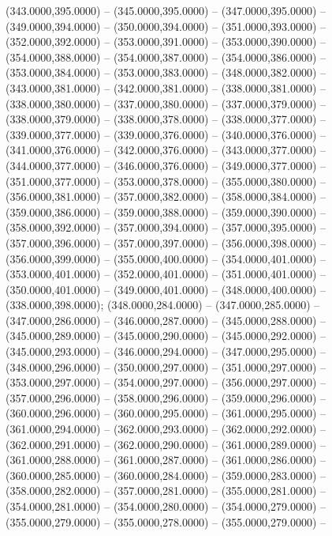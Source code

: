 \begin{scope}[shift={(-231.87,-121.87)}]
\begin{scope}[draw=black,fill=cfdae61,line join=round,line width=0.208pt]
        (343.0000,395.0000) -- (345.0000,395.0000) -- (347.0000,395.0000) --
        (349.0000,394.0000) -- (350.0000,394.0000) -- (351.0000,393.0000) --
        (352.0000,392.0000) -- (353.0000,391.0000) -- (353.0000,390.0000) --
        (354.0000,388.0000) -- (354.0000,387.0000) -- (354.0000,386.0000) --
        (353.0000,384.0000) -- (353.0000,383.0000) -- (348.0000,382.0000) --
        (343.0000,381.0000) -- (342.0000,381.0000) -- (338.0000,381.0000) --
        (338.0000,380.0000) -- (337.0000,380.0000) -- (337.0000,379.0000) --
        (338.0000,379.0000) -- (338.0000,378.0000) -- (338.0000,377.0000) --
        (339.0000,377.0000) -- (339.0000,376.0000) -- (340.0000,376.0000) --
        (341.0000,376.0000) -- (342.0000,376.0000) -- (343.0000,377.0000) --
        (344.0000,377.0000) -- (346.0000,376.0000) -- (349.0000,377.0000) --
        (351.0000,377.0000) -- (353.0000,378.0000) -- (355.0000,380.0000) --
        (356.0000,381.0000) -- (357.0000,382.0000) -- (358.0000,384.0000) --
        (359.0000,386.0000) -- (359.0000,388.0000) -- (359.0000,390.0000) --
        (358.0000,392.0000) -- (357.0000,394.0000) -- (357.0000,395.0000) --
        (357.0000,396.0000) -- (357.0000,397.0000) -- (356.0000,398.0000) --
        (356.0000,399.0000) -- (355.0000,400.0000) -- (354.0000,401.0000) --
        (353.0000,401.0000) -- (352.0000,401.0000) -- (351.0000,401.0000) --
        (350.0000,401.0000) -- (349.0000,401.0000) -- (348.0000,400.0000) --
        (338.0000,398.0000);
       (348.0000,284.0000) -- (347.0000,285.0000) --
        (347.0000,286.0000) -- (346.0000,287.0000) -- (345.0000,288.0000) --
        (345.0000,289.0000) -- (345.0000,290.0000) -- (345.0000,292.0000) --
        (345.0000,293.0000) -- (346.0000,294.0000) -- (347.0000,295.0000) --
        (348.0000,296.0000) -- (350.0000,297.0000) -- (351.0000,297.0000) --
        (353.0000,297.0000) -- (354.0000,297.0000) -- (356.0000,297.0000) --
        (357.0000,296.0000) -- (358.0000,296.0000) -- (359.0000,296.0000) --
        (360.0000,296.0000) -- (360.0000,295.0000) -- (361.0000,295.0000) --
        (361.0000,294.0000) -- (362.0000,293.0000) -- (362.0000,292.0000) --
        (362.0000,291.0000) -- (362.0000,290.0000) -- (361.0000,289.0000) --
        (361.0000,288.0000) -- (361.0000,287.0000) -- (361.0000,286.0000) --
        (360.0000,285.0000) -- (360.0000,284.0000) -- (359.0000,283.0000) --
        (358.0000,282.0000) -- (357.0000,281.0000) -- (355.0000,281.0000) --
        (354.0000,281.0000) -- (354.0000,280.0000) -- (354.0000,279.0000) --
        (355.0000,279.0000) -- (355.0000,278.0000) -- (355.0000,279.0000) --

\end{scope}
\end{scope}
